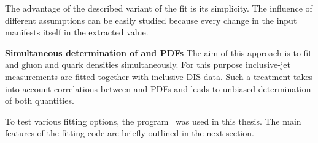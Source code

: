 The advantage of the described variant of the fit is its simplicity. The influence of different assumptions can be easily studied because every change in the input manifests itself in the extracted \asz value. 

{\flushleft \textbf{Simultaneous determination of \asz and PDFs}}\newline
The aim of this approach is to fit \asz and gluon and quark densities simultaneously. For this purpose inclusive-jet measurements are fitted together with inclusive DIS data. Such a treatment takes into account correlations between \as and PDFs and leads to unbiased determination of both quantities. %

To test various fitting options, the \herafitter program~\cite{Aaron:2009aa,Aaron:2009kv} was used in this thesis. The main features of the fitting code are briefly outlined in the next section. 